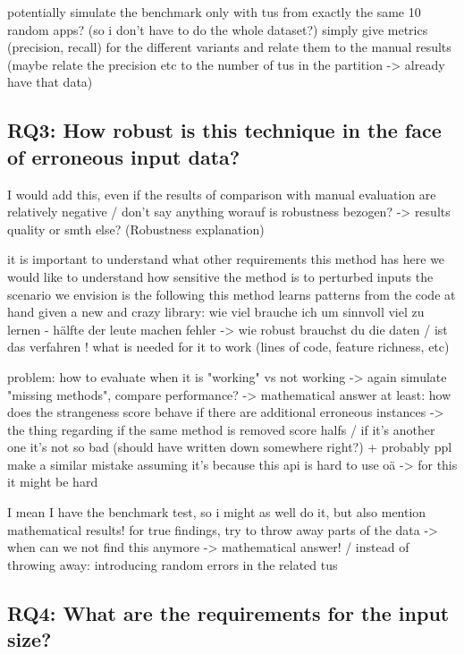 potentially simulate the benchmark only with tus from exactly the same 10 random apps? (so i don't have to do the whole dataset?)
simply give metrics (precision, recall) for the different variants and relate them to the manual results
(maybe relate the precision etc to the number of tus in the partition -> already have that data)

\subsection{RQ3: How robust is this technique in the face of erroneous input data?}

I would add this, even if the results of comparison with manual evaluation are relatively negative / don't say anything
worauf is robustness bezogen? -> results quality or smth else? (Robustness explanation)

it is important to understand what other requirements this method has
here we would like to understand how sensitive the method is to perturbed inputs
the scenario we envision is the following
    this method learns patterns from the code at hand
    given a new and crazy library:
    wie viel brauche ich um sinnvoll viel zu lernen - hälfte der leute machen fehler -> wie robust brauchst du die daten / ist das verfahren !
    what is needed for it to work (lines of code, feature richness, etc) 

problem: how to evaluate when it is "working" vs not working -> again simulate "missing methods", compare performance?
-> mathematical answer at least: how does the strangeness score behave if there are additional erroneous instances
    -> the thing regarding if the same method is removed score halfs / if it's another one it's not so bad (should have written down somewhere right?)
    + probably ppl make a similar mistake assuming it's because this api is hard to use oä
    -> for this it might be hard

I mean I have the benchmark test, so i might as well do it, but also mention mathematical results!
for true findings, try to throw away parts of the data -> when can we not find this anymore -> mathematical answer!
/ instead of throwing away: introducing random errors in the related tus

\subsection{RQ4: What are the requirements for the input size?}

